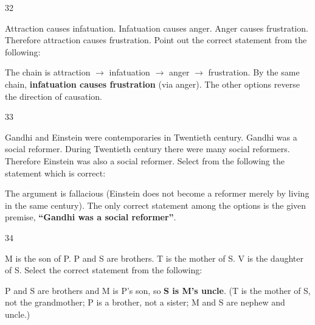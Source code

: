 \begin{question}{32}
{Attraction causes infatuation. Infatuation causes anger. Anger causes frustration. Therefore attraction causes frustration. Point out the correct statement from the following:\par}
\begin{explain}
The chain is attraction $\rightarrow$ infatuation $\rightarrow$ anger $\rightarrow$ frustration. By the same chain, \textbf{infatuation causes frustration} (via anger). The other options reverse the direction of causation.
\end{explain}
\end{question}

\begin{question}{33}
{Gandhi and Einstein were contemporaries in Twentieth century. Gandhi was a social reformer. During Twentieth century there were many social reformers. Therefore Einstein was also a social reformer. Select from the following the statement which is correct:\par}
\begin{explain}
The argument is fallacious (Einstein does not become a reformer merely by living in the same century). The only correct statement among the options is the given premise, \textbf{``Gandhi was a social reformer''}.
\end{explain}
\end{question}

\begin{question}{34}
{M is the son of P. P and S are brothers. T is the mother of S. V is the daughter of S. Select the correct statement from the following:\par}
\begin{explain}
P and S are brothers and M is P's son, so \textbf{S is M's uncle}. (T is the mother of S, not the grandmother; P is a brother, not a sister; M and S are nephew and uncle.)
\end{explain}
\end{question}

